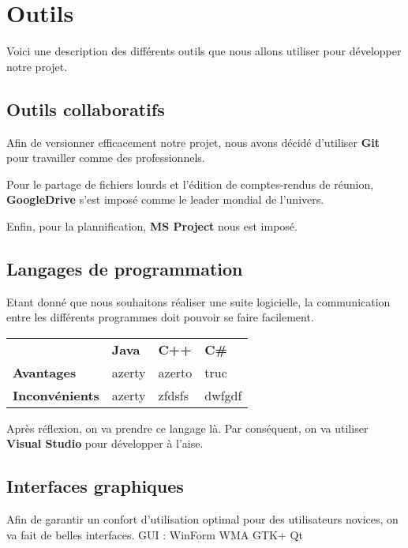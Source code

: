 \chapter{Outils}
	Voici une description des différents outils que nous allons utiliser pour développer notre projet.
	 
	\section{Outils collaboratifs}
		Afin de versionner efficacement notre projet, nous avons décidé d'utiliser {\bf Git} pour travailler comme des professionnels.

		Pour le partage de fichiers lourds et l'édition de comptes-rendus de réunion, {\bf GoogleDrive} s'est imposé comme le leader mondial de l'univers.

		Enfin, pour la plannification, {\bf MS Project} nous est imposé.

	\section{Langages de programmation}
		Etant donné que nous souhaitons réaliser une suite logicielle, la communication entre les différents programmes doit pouvoir se faire facilement.

		\begin{tabular}{llll}
		   	 					& {\bf Java} 	& {\bf C++} 	& {\bf C\#}  \\
		   {\bf Avantages} 		& azerty		& azerto		& truc\\
		   {\bf Inconvénients}  & azerty 		& zfdsfs		& dwfgdf\\
		\end{tabular}

		Après réflexion, on va prendre ce langage là. Par conséquent, on va utiliser {\bf Visual Studio} pour développer à l'aise.

	\section{Interfaces graphiques}
		Afin de garantir un confort d'utilisation optimal pour des utilisateurs novices, on va fait de belles interfaces.
		GUI :
		WinForm
		WMA
		GTK+
		Qt





